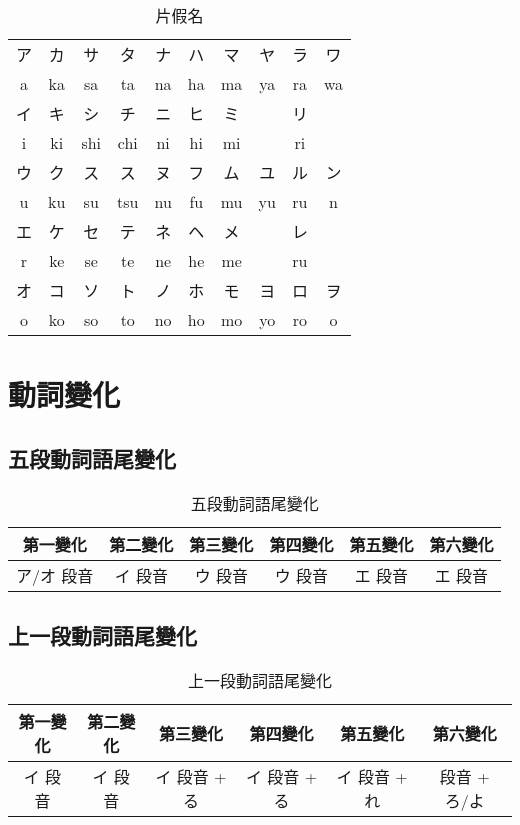 \documentclass[12pt]{article}
\begin{document}
\begin{CJK}{UTF8}{cybercjk}
\begin{table}[htdp]
\caption{片假名}
\begin{tabular}{cccccccccc}
\hline
ア& カ & サ & タ & ナ & ハ & マ & ヤ & ラ & ワ\\
a & ka & sa & ta & na & ha & ma& ya & ra & wa\\
\hline
イ& キ & シ & チ & ニ & ヒ & ミ &  & リ & \\
i & ki & shi & chi & ni & hi & mi & & ri& \\
\hline
ウ& ク & ス & ス & ヌ & フ & ム & ユ & ル & ン\\
 u & ku &  su &  tsu &  nu &  fu &  mu &  yu &  ru & n\\	
\hline
エ& ケ & セ & テ & ネ & ヘ & メ & & レ & \\
 r & ke &  se &  te &  ne &  he &  me & &  ru & \\	
\hline
オ& コ & ソ & ト & ノ & ホ & モ & ヨ & ロ & ヲ\\
 o &  ko &  so &  to &  no &  ho &  mo &  yo &  ro & o\\	

\hline
\end{tabular}
\end{table}

\section{動詞變化}

\subsection{五段動詞語尾變化}

\begin{table}[htdp]
{\scriptsize
\begin{tabular}{cccccc}
\hline
第一變化 & 第二變化 & 第三變化 & 第四變化 & 第五變化 & 第六變化 \\
\hline
ア/オ 段音 & イ 段音 & ウ 段音 & ウ 段音  & エ 段音 & エ 段音  \\
\hline
\end{tabular}
\caption{五段動詞語尾變化}
}
\end{table}

\subsection{上一段動詞語尾變化}
\begin{table}[htdp]
{\scriptsize
\begin{tabular}{cccccc}
\hline
第一變化 & 第二變化 & 第三變化 & 第四變化 & 第五變化 & 第六變化 \\
\hline
イ 段音 & イ 段音 & イ 段音 + る &  イ 段音 + る &  イ 段音 + れ &  段音 + ろ/よ \\
\hline
\end{tabular}
\caption{上一段動詞語尾變化}
}
\end{table}


\end{CJK}
\end{document}
